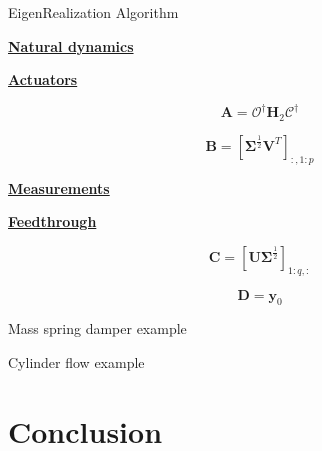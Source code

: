 \documentclass[aspectratio=169, usenames, dvipsnames]{beamer}
\begin{document}
\begin{frame}{EigenRealization Algorithm}
  \vfill

  \begin{minipage}{.48\textwidth}
    \centering
    \underline{\textbf{Natural dynamics}}
  \end{minipage}%
  \hfill
  \begin{minipage}{.48\textwidth}
    \centering
    \underline{\textbf{Actuators}}
  \end{minipage}

  \bigskip

  \begin{minipage}{.48\textwidth}
    {
    \Large
    \[
      \bm{A} = \mathcal{O}^{\dagger} \bm{H}_2 \mathcal{C}^{\dagger}
    \]
    }
  \end{minipage}%
  \hfill
  \begin{minipage}{.48\textwidth}
    {
    \Large
    \[
      \bm{B} = \left[ \boldsymbol{\Sigma}^{\frac12} \bm{V}^T \right]_{:, 1:p}
    \]
    }
  \end{minipage}

  \vfill

  \begin{minipage}{.48\textwidth}
    \centering
    \underline{\textbf{Measurements}}
  \end{minipage}%
  \hfill
  \begin{minipage}{.48\textwidth}
    \centering
    \underline{\textbf{Feedthrough}}
  \end{minipage}

  \bigskip

  \begin{minipage}{.48\textwidth}
    {
    \Large
    \[
      \bm{C} = \left[ \bm{U} \boldsymbol{\Sigma}^{\frac12} \right]_{1:q, :}
    \]
    }
  \end{minipage}%
  \hfill
  \begin{minipage}{.48\textwidth}
    {
    \Large
    \[
      \bm{D} = \bm{y}_0
    \]
    }
  \end{minipage}

  \vfill
\end{frame}

\begin{frame}
  Mass spring damper example
\end{frame}

\begin{frame}
  Cylinder flow example
\end{frame}

\section{Conclusion}
\begin{frame}
  \sectionpage
\end{frame}
\end{document}
